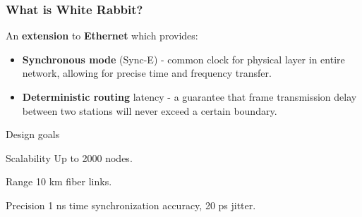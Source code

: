 \documentclass[compress,red]{beamer}
\begin{document}
\frame
{
  \frametitle{What is White Rabbit?}

\begin{block}{}
  An \textbf{extension} to \textbf{Ethernet} which provides:
  \begin{itemize}
  \item \textbf{Synchronous mode} (Sync-E) - common clock for physical layer in entire network, allowing for precise time and frequency transfer.

\item \textbf{Deterministic routing} latency - a guarantee that frame transmission delay between two stations will never exceed a certain boundary.
\end{itemize}
\end{block}

}

\begin{frame}{Design goals}
\begin{block}{Scalability}
Up to 2000 nodes.
\end{block}

\begin{block}{Range}
10 km fiber links.
\end{block}

\begin{block}{Precision}
1 ns time synchronization accuracy, 20 ps jitter.
\end{block}

\end{frame}

\end{document}
